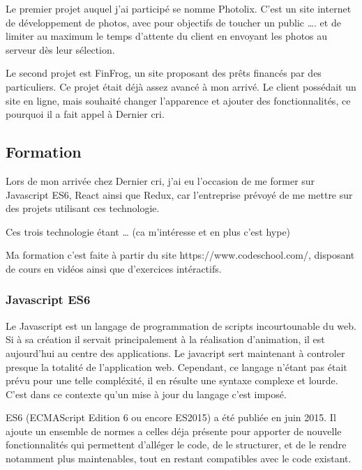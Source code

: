 \bigskip

Le premier projet auquel j'ai participé se nomme Photolix. C'est un site
internet de développement de photos, avec pour objectifs de toucher un
public \ldots{}. et de limiter au maximum le temps d'attente du client
en envoyant les photos au serveur dès leur sélection.

\bigskip

Le second projet est FinFrog, un site proposant des prêts financés par
des particuliers. Ce projet était déjà assez avancé à mon arrivé. Le
client possédait un site en ligne, mais souhaité changer l'apparence et
ajouter des fonctionnalités, ce pourquoi il a fait appel à Dernier cri.

\subsection{Formation}\label{formation}

\bigskip

Lors de mon arrivée chez Dernier cri, j'ai eu l'occasion de me former
sur Javascript ES6, React ainsi que Redux, car l'entreprise prévoyé de
me mettre sur des projets utilisant ces technologie.

\bigskip

Ces trois technologie étant \ldots{} (ca m'intéresse et en plus c'est
hype)

\bigskip

Ma formation c'est faite à partir du site https://www.codeschool.com/,
disposant de cours en vidéos ainsi que d'exercices intéractifs.

\bigskip

\subsubsection{Javascript ES6}\label{javascript-es6}

\bigskip

Le Javascript est un langage de programmation de scripts incourtounable
du web. Si à sa création il servait principalement à la réalisation
d'animation, il est aujourd'hui au centre des applications. Le javacript
sert maintenant à controler presque la totalité de l'application web.
Cependant, ce langage n'étant pas était prévu pour une telle compléxité,
il en résulte une syntaxe complexe et lourde. C'est dans ce contexte
qu'un mise à jour du langage c'est imposé.

\bigskip

ES6 (ECMAScript Edition 6 ou encore ES2015) a été publiée en juin 2015.
Il ajoute un ensemble de normes a celles déja présente pour apporter de
nouvelle fonctionnalités qui permettent d'alléger le code, de le
structurer, et de le rendre notamment plus maintenables, tout en restant
compatibles avec le code existant.

